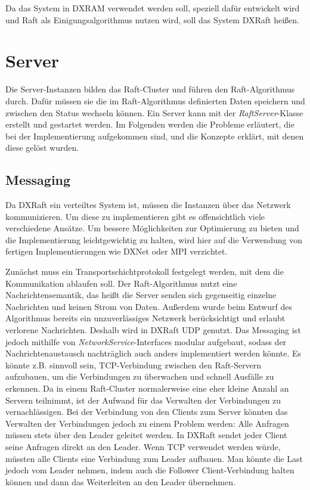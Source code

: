 Da das System in DXRAM verwendet werden soll, speziell dafür entwickelt wird und Raft als Einigungsalgorithmus nutzen wird, soll das System DXRaft heißen.

\section{Server}

Die Server-Instanzen bilden das Raft-Cluster und führen den Raft-Algorithmus durch. Dafür müssen sie die im Raft-Algorithmus definierten Daten speichern und zwischen den Status wechseln können. Ein Server kann mit der \textit{RaftServer}-Klasse erstellt und gestartet werden. Im Folgenden werden die Probleme erläutert, die bei der Implementierung aufgekommen sind, und die Konzepte erklärt, mit denen diese gelöst wurden.

\subsection{Messaging}
\label{messaging}

Da DXRaft ein verteiltes System ist, müssen die Instanzen über das Netzwerk kommunizieren. Um diese zu implementieren gibt es offensichtlich viele verschiedene Ansätze. Um bessere Möglichkeiten zur Optimierung zu bieten und die Implementierung leichtgewichtig zu halten, wird hier auf die Verwendung von fertigen Implementierungen wie DXNet oder MPI verzichtet.

Zunächst muss ein Transportschichtprotokoll festgelegt werden, mit dem die Kommunikation ablaufen soll. 
Der Raft-Algorithmus nutzt eine Nachrichtensemantik, das heißt die Server senden sich gegenseitig einzelne Nachrichten und keinen Strom von Daten. Außerdem wurde beim Entwurf des Algorithmus bereits ein unzuverlässiges Netzwerk berücksichtigt und erlaubt verlorene Nachrichten. Deshalb wird in DXRaft UDP genutzt. Das Messaging ist jedoch mithilfe von \textit{NetworkService}-Interfaces modular aufgebaut, sodass der Nachrichtenaustausch nachträglich auch anders implementiert werden könnte. Es könnte z.B. sinnvoll sein, TCP-Verbindung zwischen den Raft-Servern aufzubauen, um die Verbindungen zu überwachen und schnell Ausfälle zu erkennen. Da in einem Raft-Cluster normalerweise eine eher kleine Anzahl an Servern teilnimmt, ist der Aufwand für das Verwalten der Verbindungen zu vernachlässigen. Bei der Verbindung von den Clients zum Server könnten das Verwalten der Verbindungen jedoch zu einem Problem werden: Alle Anfragen müssen stets über den Leader geleitet werden. In DXRaft sendet jeder Client seine Anfragen direkt an den Leader. Wenn TCP verwendet werden würde, müssten alle Clients eine Verbindung zum Leader aufbauen. Man könnte die Last jedoch vom Leader nehmen, indem auch die Follower Client-Verbindung halten können und dann das Weiterleiten an den Leader übernehmen. 

